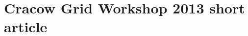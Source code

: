 \documentclass[pdflatex,en]{aghdpl}  %
\begin{document}







\appendix
\chapter{Cracow Grid Workshop 2013 short article}



\clearpage
{}
{}
\glsaddall
\printglossaries

\clearpage
{}
{}
{}

\end{document}
